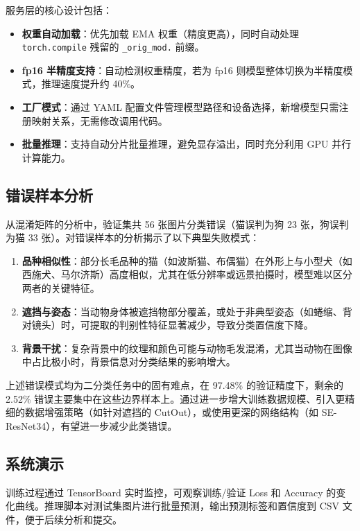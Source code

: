 \documentclass[12pt,a4paper]{ctexart}
\begin{document}
服务层的核心设计包括：
\begin{itemize}
    \item \textbf{权重自动加载}：优先加载 EMA 权重（精度更高），同时自动处理 \texttt{torch.compile} 残留的 \texttt{\_orig\_mod.} 前缀。
    \item \textbf{fp16 半精度支持}：自动检测权重精度，若为 fp16 则模型整体切换为半精度模式，推理速度提升约 40\%。
    \item \textbf{工厂模式}：通过 YAML 配置文件管理模型路径和设备选择，新增模型只需注册映射关系，无需修改调用代码。
    \item \textbf{批量推理}：支持自动分片批量推理，避免显存溢出，同时充分利用 GPU 并行计算能力。
\end{itemize}

\subsection{错误样本分析}

从混淆矩阵的分析中，验证集共 56 张图片分类错误（猫误判为狗 23 张，狗误判为猫 33 张）。对错误样本的分析揭示了以下典型失败模式：

\begin{enumerate}
    \item \textbf{品种相似性}：部分长毛品种的猫（如波斯猫、布偶猫）在外形上与小型犬（如西施犬、马尔济斯）高度相似，尤其在低分辨率或远景拍摄时，模型难以区分两者的关键特征。
    \item \textbf{遮挡与姿态}：当动物身体被遮挡物部分覆盖，或处于非典型姿态（如蜷缩、背对镜头）时，可提取的判别性特征显著减少，导致分类置信度下降。
    \item \textbf{背景干扰}：复杂背景中的纹理和颜色可能与动物毛发混淆，尤其当动物在图像中占比极小时，背景信息对分类结果的影响增大。
\end{enumerate}

上述错误模式均为二分类任务中的固有难点，在 97.48\% 的验证精度下，剩余的 2.52\% 错误主要集中在这些边界样本上。通过进一步增大训练数据规模、引入更精细的数据增强策略（如针对遮挡的 CutOut），或使用更深的网络结构（如 SE-ResNet34），有望进一步减少此类错误。

\subsection{系统演示}

训练过程通过 TensorBoard 实时监控，可观察训练/验证 Loss 和 Accuracy 的变化曲线。推理脚本对测试集图片进行批量预测，输出预测标签和置信度到 CSV 文件，便于后续分析和提交。
\end{document}
